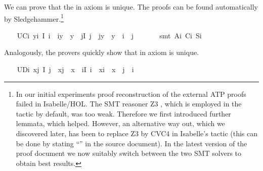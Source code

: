 \begin{isabellebody}
\endisatagproof
{\isafoldproof}%
%
\isadelimproof
%
\endisadelimproof
%
\begin{isamarkuptext}%
We can prove that the  in axiom  is unique. The proofs can be 
   found automatically by Sledgehammer.\footnote{In our initial experiments proof reconstruction of the
   external ATP proofs failed in Isabelle/HOL. The SMT reasoner Z3 \cite{Z3}, which is employed
   in the  tactic by default, was too weak. Therefore we first introduced further lemmata, 
   which helped. 
   However, an alternative way out, which we discovered later, has been to replace Z3 by CVC4 \cite{CVC4} 
   in Isabelle's  
   tactic (this can be done by stating ``'' in the source document).
   In the latest version of the proof document we now suitably switch between the two SMT solvers to obtain best results.}%
\end{isamarkuptext}\isamarkuptrue%
\ \ \isamarkupfalse%
\ UC\isactrlsub i{\isacharcolon}\ {\isachardoublequoteopen}\isactrlbold {\isasymforall}y{\isachardot}\isactrlbold {\isasymexists}i{\isachardot}\ I\ i\ \isactrlbold {\isasymand}\ i{\isasymcdot}y\ {\isasymcong}\ y\ \isactrlbold {\isasymand}\ {\isacharparenleft}\isactrlbold {\isasymforall}j{\isachardot}{\isacharparenleft}I\ j\ \isactrlbold {\isasymand}\ j{\isasymcdot}y\ {\isasymcong}\ y{\isacharparenright}\ \isactrlbold {\isasymrightarrow}\ i\ {\isasymcong}\ j{\isacharparenright}{\isachardoublequoteclose}\ \isanewline
%
\isadelimproof
\ \ \ \ %
\endisadelimproof
%
\isatagproof
{}\isamarkupfalse%
\ {\isacharparenleft}smt\ A\isactrlsub i\ C\isactrlsub i\ S\isactrlsub i{\isacharparenright}%
\endisatagproof
{\isafoldproof}%
%
\isadelimproof
%
\endisadelimproof
%
\begin{isamarkuptext}%
Analogously, the provers quickly show that  in axiom  is unique.%
\end{isamarkuptext}\isamarkuptrue%
\ \ \isamarkupfalse%
\ UD\isactrlsub i{\isacharcolon}\ {\isachardoublequoteopen}\isactrlbold {\isasymforall}x{\isachardot}\isactrlbold {\isasymexists}j{\isachardot}\ I\ j\ \isactrlbold {\isasymand}\ x{\isasymcdot}j\ {\isasymcong}\ x\ \isactrlbold {\isasymand}\ {\isacharparenleft}\isactrlbold {\isasymforall}i{\isachardot}{\isacharparenleft}I\ i\ \isactrlbold {\isasymand}\ x{\isasymcdot}i\ {\isasymcong}\ x{\isacharparenright}\ \isactrlbold {\isasymrightarrow}\ j\ {\isasymcong}\ i{\isacharparenright}{\isachardoublequoteclose}\ \ \isanewline

\end{isabellebody}
